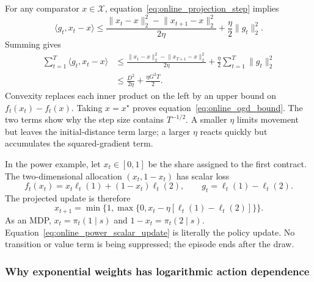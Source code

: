 For any comparator $x\in\mathcal X$, equation~\eqref{eq:online_projection_step} implies
\begin{equation}
\langle g_t,x_t-x\rangle
\leq
\frac{\lVert x_t-x\rVert_2^2-\lVert x_{t+1}-x\rVert_2^2}{2\eta}
+\frac{\eta}{2}\lVert g_t\rVert_2^2.
\label{eq:online_ogd_one_step}
\end{equation}
Summing gives
\begin{align}
\sum_{t=1}^T\langle g_t,x_t-x\rangle
&\leq
\frac{\lVert x_1-x\rVert_2^2-\lVert x_{T+1}-x\rVert_2^2}{2\eta}
+\frac{\eta}{2}\sum_{t=1}^T\lVert g_t\rVert_2^2 \nonumber\\
&\leq \frac{D^2}{2\eta}+\frac{\eta G^2T}{2}.
\label{eq:online_ogd_telescoping}
\end{align}
Convexity replaces each inner product on the left by an upper bound on $f_t(x_t)-f_t(x)$. Taking $x=x^\star$ proves equation~\eqref{eq:online_ogd_bound}. The two terms show why the step size contains $T^{-1/2}$. A smaller $\eta$ limits movement but leaves the initial-distance term large; a larger $\eta$ reacts quickly but accumulates the squared-gradient term.

In the power example, let $x_t\in[0,1]$ be the share assigned to the first contract. The two-dimensional allocation $(x_t,1-x_t)$ has scalar loss
\[
f_t(x_t)=x_t\ell_t(1)+(1-x_t)\ell_t(2),
\qquad
g_t=\ell_t(1)-\ell_t(2).
\]
The projected update is therefore
\begin{equation}
x_{t+1}=\min\{1,\max\{0,x_t-\eta[\ell_t(1)-\ell_t(2)]\}\}.
\label{eq:online_power_scalar_update}
\end{equation}
As an MDP, $x_t=\pi_t(1\mid s)$ and $1-x_t=\pi_t(2\mid s)$. Equation~\eqref{eq:online_power_scalar_update} is literally the policy update. No transition or value term is being suppressed; the episode ends after the draw.

\subsubsection{Why exponential weights has logarithmic action dependence}

